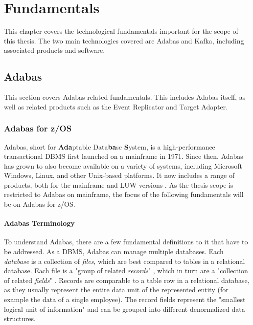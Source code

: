 \chapter{Fundamentals}
\label{ch02:fundamentals}
This chapter covers the technological fundamentals important for the scope of this thesis. The two main technologies covered are Adabas and Kafka, including associated products and software.

\section{Adabas}
\label{ch02:fundamentals:adabas}
This section covers Adabas-related fundamentals. This includes Adabas itself, as well as related products such as the Event Replicator and Target Adapter.

\subsection{Adabas for z/OS}
\label{ch02:fundamentals:adabas:forzos}
Adabas, short for \textbf{Ada}ptable Data\textbf{ba}se \textbf{S}ystem, is a high-performance transactional \ac{DBMS} first launched on a mainframe in 1971. Since then, Adabas has grown to also become available on a variety of systems, including Microsoft Windows, Linux, and other Unix-based platforms. It now includes a range of products, both for the mainframe and \ac{LUW} versions \cite{adabasconcepts}. As the thesis scope is restricted to Adabas on mainframe, the focus of the following fundamentals will be on Adabas for z/OS.
\subsubsection{Adabas Terminology}
To understand Adabas, there are a few fundamental definitions to it that have to be addressed. As a \ac{DBMS}, Adabas can manage multiple databases. Each \textit{database} is a collection of \textit{files}, which are best compared to tables in a relational database. Each file is a "group of related \textit{records}" \cite{adabasconcepts}, which in turn are a "collection of related \textit{fields}" %
\cite{adabasconcepts}. Records are comparable to a table row in a relational database, as they usually represent the entire data unit of the represented entity (for example the data of a single employee). The record fields represent the "smallest logical unit of information" \cite{adabasconcepts} and can be grouped into different denormalized data structures.

